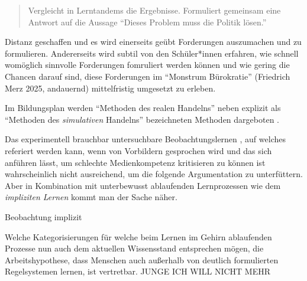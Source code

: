 \begin{quote}
    Vergleicht in Lerntandems die Ergebnisse. Formuliert gemeinsam eine Antwort auf die Aussage \enquote{Dieses Problem muss die Politik lösen.}
\end{quote}

Distanz geschaffen und es wird einerseits geübt Forderungen auszumachen und zu formulieren. Andererseits wird subtil von den Schüler*innen erfahren, wie schnell womöglich sinnvolle Forderungen fomruliert werden können und wie gering die Chancen darauf sind, diese Forderungen im \enquote{Monstrum Bürokratie} (Friedrich Merz 2025, andauernd) mittelfristig umgesetzt zu erleben. 

Im Bildungsplan werden \enquote{Methoden des realen Handelns} \autocite[13]{bplan} neben explizit als \enquote{Methoden des \emph{simulativen} Handelns} bezeichneten Methoden dargeboten \autocite[14]{bplan}.

Das experimentell brauchbar untersuchbare Beobachtungslernen \autocite{Bandura.1977}, auf welches referiert werden kann, wenn von Vorbildern gesprochen wird und das sich anführen lässt, um schlechte Medienkompetenz kritisieren zu können ist wahrscheinlich nicht ausreichend, um die folgende Argumentation zu unterfüttern.
Aber in Kombination mit unterbewusst ablaufenden Lernprozessen wie dem \emph{impliziten Lernen} \autocite[82-93]{Kiesel2012} kommt man der Sache näher.






Beobachtung \autocite[72-81]{Kiesel2012}
implizit 

Welche Kategorisierungen für welche beim Lernen im Gehirn ablaufenden Prozesse nun auch dem aktuellen Wissensstand entsprechen mögen, die Arbeitshypothese, dass Menschen auch außerhalb von deutlich formulierten Regelsystemen lernen, ist vertretbar. 
JUNGE ICH WILL NICHT MEHR



